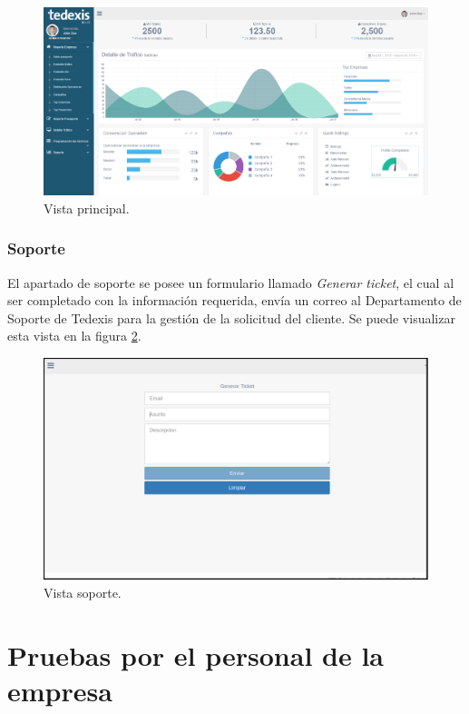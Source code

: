 \begin{figure}[ht]
  \centering
  \includegraphics[scale=0.30,type=png,ext=.png,read=.png]{imagenes/principal}
  \caption{Vista principal.}
  \label{fig:principal}
\end{figure}

\subsubsection{Soporte}
\indent El apartado de soporte se posee un formulario llamado \textit{Generar ticket}, el cual al ser completado con la información requerida, envía un correo al Departamento de Soporte de Tedexis para la gestión de la solicitud del cliente. Se puede visualizar esta vista en la figura \ref{fig:soporte}.

\begin{figure}[ht]
  \centering
  \includegraphics[scale=0.30,type=png,ext=.png,read=.png]{imagenes/soporte}
  \caption{Vista soporte.}
  \label{fig:soporte}
\end{figure}


\section{Pruebas por el personal de la empresa} \label{sect:Pruebas por el personal de la empresa}

